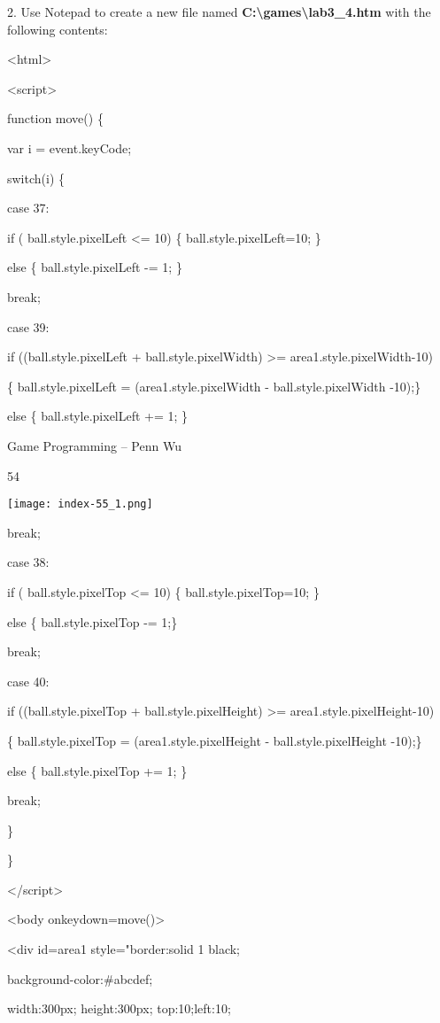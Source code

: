 \documentclass[
]{article}
\begin{document}
2. Use Notepad to create a new file named
\textbf{C:\textbackslash games\textbackslash lab3\_4.htm} with the
following contents:

\textless html\textgreater{}

\textless script\textgreater{}

function move() \{

var i = event.keyCode;

switch(i) \{

case 37:

if ( ball.style.pixelLeft \textless= 10) \{ ball.style.pixelLeft=10; \}

else \{ ball.style.pixelLeft -= 1; \}

break;

case 39:

if ((ball.style.pixelLeft + ball.style.pixelWidth) \textgreater=
area1.style.pixelWidth-10)

\{ ball.style.pixelLeft = (area1.style.pixelWidth -
ball.style.pixelWidth -10);\}

else \{ ball.style.pixelLeft += 1; \}

Game Programming -- Penn Wu

54

\protect\hypertarget{index_split_004.htmlux5cux23p55}{}{}\texttt{[image: index-55\_1.png]}

break;

case 38:

if ( ball.style.pixelTop \textless= 10) \{ ball.style.pixelTop=10; \}

else \{ ball.style.pixelTop -= 1;\}

break;

case 40:

if ((ball.style.pixelTop + ball.style.pixelHeight) \textgreater=
area1.style.pixelHeight-10)

\{ ball.style.pixelTop = (area1.style.pixelHeight -
ball.style.pixelHeight -10);\}

else \{ ball.style.pixelTop += 1; \}

break;

\}

\}

\textless/script\textgreater{}

\textless body onkeydown=move()\textgreater{}

\textless div id=area1 style="border:solid 1 black;

background-color:\#abcdef;

width:300px; height:300px; top:10;left:10;
\end{document}
